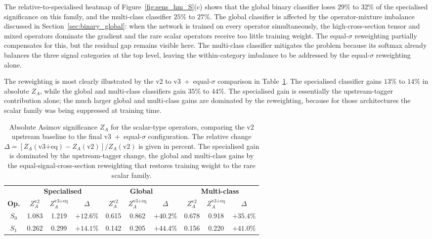 The relative-to-specialised heatmap of Figure~\ref{fig:sens_hm_S}(c) shows that the global binary classifier loses $29\%$ to $32\%$ of the specialised significance on this family, and the multi-class classifier $25\%$ to $27\%$. The global classifier is affected by the operator-mixture imbalance discussed in Section~\ref{sec:binary_global}: when the network is trained on every operator simultaneously, the high-cross-section tensor and mixed operators dominate the gradient and the rare scalar operators receive too little training weight. The equal-$\sigma$ reweighting partially compensates for this, but the residual gap remains visible here. The multi-class classifier mitigates the problem because its softmax already balances the three signal categories at the top level, leaving the within-category imbalance to be addressed by the equal-$\sigma$ reweighting alone.

The reweighting is most clearly illustrated by the v2 to v3~+~equal-$\sigma$ comparison in Table~\ref{tab:sens_gain_S}. The specialised classifier gains $13\%$ to $14\%$ in absolute $Z_A$, while the global and multi-class classifiers gain $35\%$ to $44\%$. The specialised gain is essentially the upstream-tagger contribution alone; the much larger global and multi-class gains are dominated by the reweighting, because for those architectures the scalar family was being suppressed at training time.

\begin{table}[htbp]
  \centering
  \caption{Absolute Asimov significance $Z_A$ for the scalar-type operators, comparing the v2 upstream baseline to the final v3~+~equal-$\sigma$ configuration. The relative change $\Delta=[Z_A(\text{v3+eq})-Z_A(\text{v2})]/Z_A(\text{v2})$ is given in percent. The specialised gain is dominated by the upstream-tagger change, the global and multi-class gains by the equal-signal-cross-section reweighting that restores training weight to the rare scalar family.}
  \label{tab:sens_gain_S}
  \begin{tabular}{|c|cc|c|cc|c|cc|c|}
    \hline
    & \multicolumn{3}{c|}{\textbf{Specialised}} & \multicolumn{3}{c|}{\textbf{Global}} & \multicolumn{3}{c|}{\textbf{Multi-class}} \\
    \textbf{Op.} & $Z_A^\text{v2}$ & $Z_A^\text{v3+eq}$ & $\Delta$ & $Z_A^\text{v2}$ & $Z_A^\text{v3+eq}$ & $\Delta$ & $Z_A^\text{v2}$ & $Z_A^\text{v3+eq}$ & $\Delta$ \\
    \hline
    $S_0$ & 1.083 & 1.219 & $+12.6\%$ & 0.615 & 0.862 & $+40.2\%$ & 0.678 & 0.918 & $+35.4\%$ \\
    $S_1$ & 0.262 & 0.299 & $+14.1\%$ & 0.142 & 0.205 & $+44.4\%$ & 0.156 & 0.220 & $+41.0\%$ \\
    \hline
  \end{tabular}
\end{table}

